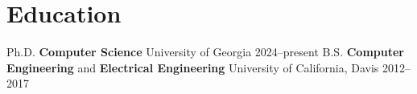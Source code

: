 \section{Education}
\begin{educationlist}
    \educationitem
        {Ph.D.}
        {\textbf{Computer Science}}
        {University of Georgia}
        {2024--present}
    \educationitem
        {B.S.}
        {\textbf{Computer Engineering} and \textbf{Electrical Engineering}}
        {University of California, Davis}
        {2012--2017}
\end{educationlist}
